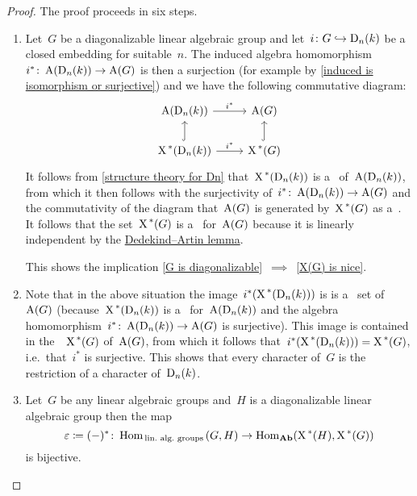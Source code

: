 \begin{proof}
  The proof proceeds in six steps.
  \begin{enumerate}[label = Step~\arabic*]
    \item
      Let~$G$ be a diagonalizable linear algebraic group and let~$i \colon G \hookrightarrow \operatorname{D}_n(k)$ be a closed embedding for suitable~$n$.
      The induced algebra homomorphism~$i^* \colon \operatorname{A}(\operatorname{D}_n(k)) \to \operatorname{A}(G)$ is then a surjection (for example by \cref{induced is isomorphism or surjective}) and we have the following commutative diagram:
      \[
        \begin{tikzcd}
            \coord(\Diag_n(k))
            \arrow{r}[above]{i^*}
          & \coord(G)
          \\
            \chargroup(\Diag_n(k))
            \arrow{r}[above]{i^*}
            \arrow[hook]{u}
          & \chargroup(G)
            \arrow[hook]{u}
        \end{tikzcd}
      \]
      It follows from \cref{structure theory for Dn} that~$\operatorname{X}^{\,*}(\operatorname{D}_n(k))$ is a~ of~$\operatorname{A}(\operatorname{D}_n(k))$, from which it then follows with the surjectivity of~$i^* \colon \operatorname{A}(\operatorname{D}_n(k)) \to \operatorname{A}(G)$ and the commutativity of the diagram that~$\operatorname{A}(G)$ is generated by~$\operatorname{X}^{\,*}(G)$ as a~.
      It follows that the set~$\operatorname{X}^{\,*}(G)$ is a~ for~$\operatorname{A}(G)$ because it is linearly independent by the \hyperref[dedekind artin lemma]{Dedekind\nobreakdash--Artin lemma}.
      
      This shows the implication \ref*{G is diagonalizable}~$\implies$~\ref*{X(G) is nice}.
      
    \item
      \label{every character a restriction}
      Note that in the above situation the image~$i^*(\operatorname{X}^{\,*}(\operatorname{D}_n(k)))$ is is a~ set of~$\operatorname{A}(G)$ (because~$\operatorname{X}^{\,*}(\operatorname{D}_n(k))$ is a~ for~$\operatorname{A}(\operatorname{D}_n(k))$ and the algebra homomorphism~$i^* \colon \operatorname{A}(\operatorname{D}_n(k)) \to \operatorname{A}(G)$ is surjective).
      This image is contained in the~~$\operatorname{X}^{\,*}(G)$ of~$\operatorname{A}(G)$, from which it follows that~$i^*(\operatorname{X}^{\,*}(\operatorname{D}_n(k))) = \operatorname{X}^{\,*}(G)$, i.e.\ that~$i^*$ is surjective.
      This shows that every character of~$G$ is the restriction of a character of~$\operatorname{D}_n(k)$.
    
    \item
      \label{fullly faithful}
      Let~$G$ be any linear algebraic groups and~$H$ is a diagonalizable linear algebraic group then the map
      \[
                  \varepsilon
        \coloneqq  (-)^*
        \colon    \operatorname{Hom}_{\,\text{lin.\ alg.\ groups}\,}(G, H)
        \to       \operatorname{Hom}_{\mathbf{Ab}}( \operatorname{X}^{\,*}(H), \operatorname{X}^{\,*}(G) )
      \]
      is bijective.
      

\end{enumerate}
\end{proof}
